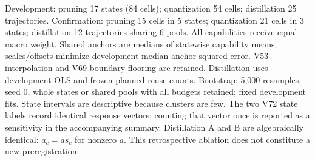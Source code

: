 \begin{table}[H]
\begin{minipage}{0.99\linewidth}\footnotesize Development: pruning 17 states (84 cells); quantization 54 cells; distillation 25 trajectories. Confirmation: pruning 15 cells in 5 states; quantization 21 cells in 3 states; distillation 12 trajectories sharing 6 pools. All capabilities receive equal macro weight. Shared anchors are medians of statewise capability means; scales/offsets minimize development median-anchor squared error. V53 interpolation and V69 boundary flooring are retained. Distillation uses development OLS and frozen planned reuse counts. Bootstrap: 5,000 resamples, seed 0, whole states or shared pools with all budgets retained; fixed development fits. State intervals are descriptive because clusters are few. The two V72 state labels record identical response vectors; counting that vector once is reported as a sensitivity in the accompanying summary. Distillation A and B are algebraically identical: $a_c=a s_c$ for nonzero $a$. This retrospective ablation does not constitute a new preregistration.\end{minipage}
\end{table}
